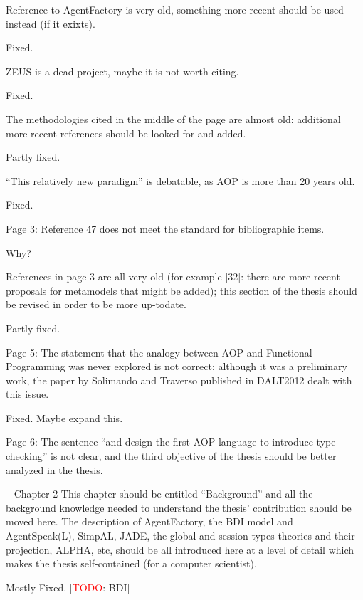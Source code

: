 \documentclass{article}
\newcommand{\todo}[1]{[\textcolor{red}{TODO}: #1]}
\newenvironment{them}{\noindent\begingroup\color{blue}}{\endgroup\par}
\begin{document}
\begin{them}
Reference to AgentFactory is very old, something more recent should be used instead (if it exixts).
\end{them}
Fixed.

\begin{them}
ZEUS is a dead project, maybe it is not worth citing.
\end{them}
Fixed.

\begin{them}
The methodologies cited in the middle of the page are almost old: additional more recent references
should be looked for and added.
\end{them}
Partly fixed.

\begin{them}
“This relatively new paradigm” is debatable, as AOP is more than 20 years old.
\end{them}
Fixed.

\begin{them}
Page 3:
Reference 47 does not meet the standard for bibliographic items.
\end{them}
Why?

\begin{them}
References in page 3 are all very old (for example [32]: there are more recent proposals for metamodels
that might be added); this section of the thesis should be revised in order to be more up-todate.
\end{them}
Partly fixed.

\begin{them}
Page 5:
The statement that the analogy between AOP and Functional Programming was never explored is not
correct; although it was a preliminary work, the paper by Solimando and Traverso published in
DALT2012 dealt with this issue.
\end{them}
Fixed. Maybe expand this.

\begin{them}
Page 6:
The sentence “and design the first AOP language to introduce type checking” is not clear, and the
third objective of the thesis should be better analyzed in the thesis.
\end{them}
\todo{Make this clear}

\begin{them}
-- Chapter 2
This chapter should be entitled “Background” and all the background knowledge needed to
understand the thesis' contribution should be moved here. The description of AgentFactory, the BDI
model and AgentSpeak(L), SimpAL, JADE, the global and session types theories and their projection,
ALPHA, etc, should be all introduced here at a level of detail which makes the thesis self-contained
(for a computer scientist).
\end{them}
Mostly Fixed.
\todo{BDI}
\end{document}
